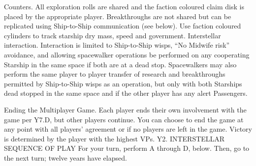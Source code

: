 \documentclass[a4paper]{book}
\begin{document}
Counters. All exploration rolls are shared and the faction coloured claim disk is placed by the appropriate player. Breakthroughs are not shared but can be replicated using Ship-to-Ship communication (see below). Use faction coloured cylinders to track starship dry mass, speed and government.
Interstellar interaction. Interaction is limited to Ship-to-Ship wisps, “No Midwife risk” avoidance, and allowing spacewalker operations be performed on any cooperating Starship in the same space if both are at a dead stop. Spacewalkers may also perform the same player to player transfer of research and breakthroughs permitted by Ship-to-Ship wisps as an operation, but only with both Starships dead stopped in the same space and if the other player has any alert Passengers.

Ending the Multiplayer Game. Each player ends their own involvement with the game per Y7.D, but other players continue. You can choose to end the game at any point with all players’ agreement or if no players are left in the game. Victory is determined by the player with the highest VPs.
Y2. INTERSTELLAR SEQUENCE OF PLAY
For your turn, perform A through D, below. Then, go to the next turn; twelve years have elapsed.
 
\end{document}
